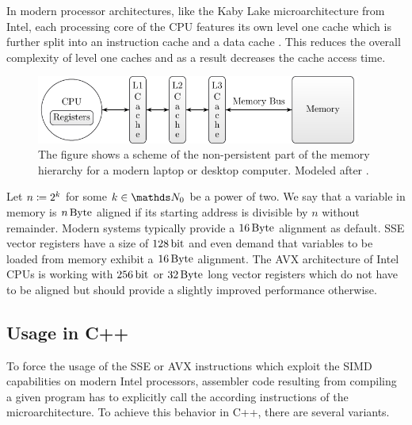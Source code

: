 \documentclass{stdlocal}
\begin{document}
    In modern processor architectures, like the Kaby Lake microarchitecture from Intel, each processing core of the CPU features its own level one cache which is further split into an instruction cache and a data cache \autocite{intel-kaby-lake}.
    This reduces the overall complexity of level one caches and as a result decreases the cache access time.
    \autocite[\ppno~78-83]{hennessy2019}
    \begin{figure}
      \center
      \includegraphics[width=0.95\textwidth]{figures/memory_hierarchy.pdf}
      \caption[Memory Hierarchy Scheme]{%
        The figure shows a scheme of the non-persistent part of the memory hierarchy for a modern laptop or desktop computer.
        Modeled after \textcite[\pno~79]{hennessy2019}.
      }
      \label{fig:memory-hierarchy}
    \end{figure}

    Let $n \coloneqq 2^k$ for some $k\in\setNatural_0$ be a power of two.
    We say that a variable in memory is $n\, \mathrm{Byte}$ aligned if its starting address is divisible by $n$ without remainder.
    Modern systems typically provide a $16\, \mathrm{Byte}$ alignment as default.
    SSE vector registers have a size of $128\, \mathrm{bit}$ and even demand that variables to be loaded from memory exhibit a $16\, \mathrm{Byte}$ alignment.
    The AVX architecture of Intel CPUs is working with $256\, \mathrm{bit}$ or $32\, \mathrm{Byte}$ long vector registers which do not have to be aligned but should provide a slightly improved performance otherwise.
    \autocite{fog2019a}

  \subsection{Usage in C++} %
  \label{sub:usage_in_c_}
    To force the usage of the SSE or AVX instructions which exploit the SIMD capabilities on modern Intel processors, assembler code resulting from compiling a given program has to explicitly call the according instructions of the microarchitecture.
    To achieve this behavior in C++, there are several variants.
\end{document}
